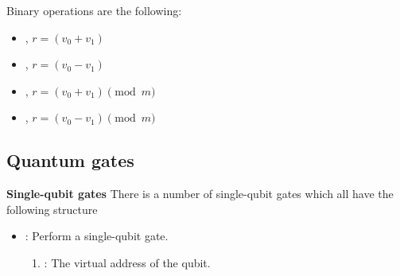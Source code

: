 Binary operations are the following:
\begin{itemize}
  \item {}, $r = (v_0 + v_1)$
  \item {}, $r = (v_0 - v_1)$
  \item {}, $r = (v_0 + v_1) \pmod{m} $
  \item {}, $r = (v_0 - v_1) \pmod{m} $
\end{itemize}

\subsection{Quantum gates}
\textbf{Single-qubit gates}
There is a number of single-qubit gates which all have the following structure
\begin{itemize}
  \item {}: Perform a single-qubit gate.
        \begin{enumerate}
          \item \REGISTER: The virtual address of the qubit.
        \end{enumerate}
\end{itemize}

